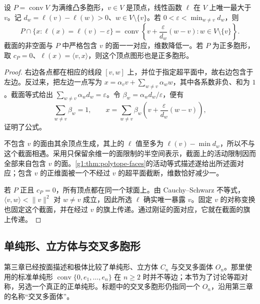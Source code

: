 \begin{lemma}
	\label{g1:lem:vertex-figure-section}
	设 \(P=\operatorname{conv}V\) 为满维凸多胞形，\(v\in V\) 是顶点，线性函数 \(\ell\) 在 \(V\) 上唯一最大于 \(v\)。记 \(d_w=\ell(v)-\ell(w)>0\)、\(w\in V\setminus\{v\}\)。若 \(0<\varepsilon<\min_{w\ne v}d_w\)，则
	\begin{equation}
		\label{g1:eq:vertex-figure-section}
		P\cap\{x:\ell(x)=\ell(v)-\varepsilon\}
		=\operatorname{conv}\left\{
		v+\frac{\varepsilon}{d_w}(w-v):w\in V\setminus\{v\}
		\right\}.
	\end{equation}
	截面的非空面与 \(P\) 中严格包含 \(v\) 的面一一对应，维数降低一。若 \(P\) 为正多胞形，取 \(c_P=0\)、\(\ell(x)=\langle v,x\rangle\)，则这个顶点图形也是正多胞形。
\end{lemma}
\begin{proof}
	右边各点都在相应的线段 \([v,w]\) 上，并位于指定超平面中，故右边包含于左边。反过来，把左边一点写为 \(x=\alpha_vv+\sum_{w\ne v}\alpha_ww\)，其中各系数非负、和为 \(1\)。截面等式给出 \(\sum_{w\ne v}\alpha_wd_w=\varepsilon\)。令 \(\beta_w=\alpha_wd_w/\varepsilon\)，便有
	\[
		\sum_{w\ne v}\beta_w=1,\qquad
		x=\sum_{w\ne v}\beta_w
		\left(v+\frac{\varepsilon}{d_w}(w-v)\right),
	\]
	证明了公式。

	不包含 \(v\) 的面由其余顶点生成，其上的 \(\ell\) 值至多为 \(\ell(v)-\min d_w\)，所以不与这个截面相遇。采用只保留余维一的面限制的半空间表示，截面上的活动限制因而全部来自包含 \(v\) 的面。\cref{g1:thm:polytope-faces}的活动等式描述遂给出所述面对应；包含 \(v\) 的正维面被一个不经过 \(v\) 的超平面截断，维数恰好减少一。

	若 \(P\) 正且 \(c_P=0\)，所有顶点都在同一个球面上。由 Cauchy--Schwarz 不等式，\(\langle v,w\rangle<\lVert v\rVert^2\) 对 \(w\ne v\) 成立，因此所选 \(\ell\) 确实唯一暴露 \(v\)。固定 \(v\) 的对称变换也固定这个截面，并在经过 \(v\) 的旗上传递。通过刚证的面对应，它就在截面的旗上传递。
\end{proof}

\subsection{单纯形、立方体与交叉多胞形}
\label{g1:subsec:E03:02}

第三章已经按面描述和极体比较了单纯形、立方体 \(C_n\) 与交叉多面体 \(O_n\)。那里使用的标准单纯形 \(\operatorname{conv}\{0,e_1,\ldots,e_n\}\) 在 \(n\ge2\) 时并不等边；本节为了讨论等距对称，另选一个真正的正单纯形。标题中的交叉多胞形仍指同一个 \(O_n\)，沿用第三章的名称“交叉多面体”。

